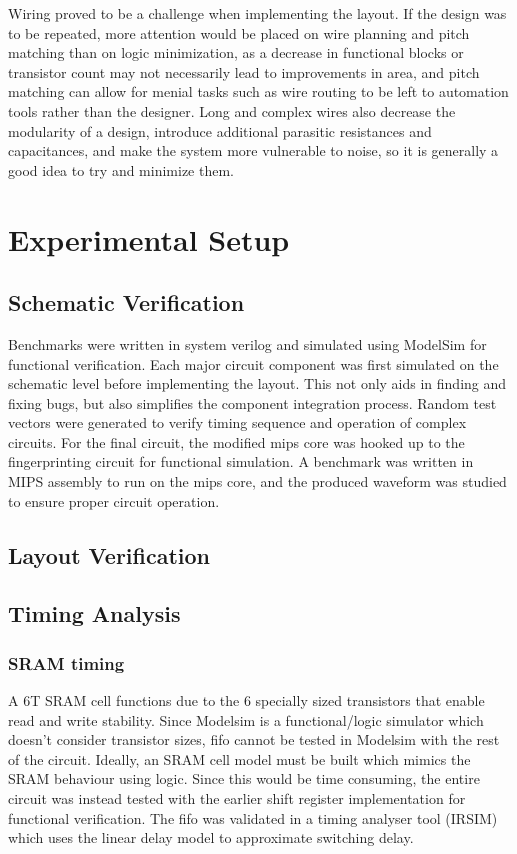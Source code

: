 \documentclass[10pt,journal,compsoc]{IEEEtran}
\begin{document}
Wiring proved to be a challenge when implementing the layout. If the design was to be repeated, more attention would be placed on wire planning and pitch matching than on logic minimization, as a decrease in functional blocks or transistor count may not necessarily lead to improvements in area, and pitch matching can allow for menial tasks such as wire routing to be left to automation tools rather than the designer. Long and complex wires also decrease the modularity of a design, introduce additional parasitic resistances and capacitances, and make the system more vulnerable to noise, so it is generally a good idea to try and minimize them.


\section{Experimental Setup}
\subsection{Schematic Verification}
Benchmarks were written in system verilog and simulated using ModelSim for functional verification. Each major circuit component was first simulated on the schematic level before implementing the layout. This not only aids in finding and fixing bugs, but also simplifies the component integration process. Random test vectors were generated to verify timing sequence and operation of complex circuits.
For the final circuit, the modified mips core was hooked up to the fingerprinting circuit for functional simulation. A benchmark was written in MIPS assembly to run on the mips core, and the produced waveform was studied to ensure proper circuit operation. 

\subsection{Layout Verification}
\subsection{Timing Analysis}

\subsubsection {\qquad  SRAM timing}
A 6T SRAM cell functions due to the 6 specially sized transistors that enable read and write stability. Since Modelsim is a functional/logic simulator which doesn’t consider transistor sizes, fifo cannot be tested in Modelsim with the rest of the circuit. Ideally, an SRAM cell model must be built which mimics the SRAM behaviour using logic. Since this would be time consuming, the entire circuit was instead tested with the earlier shift register implementation for functional verification. The fifo was validated in a timing analyser tool (IRSIM) which uses the linear delay model to approximate switching delay. 
\end{document}
